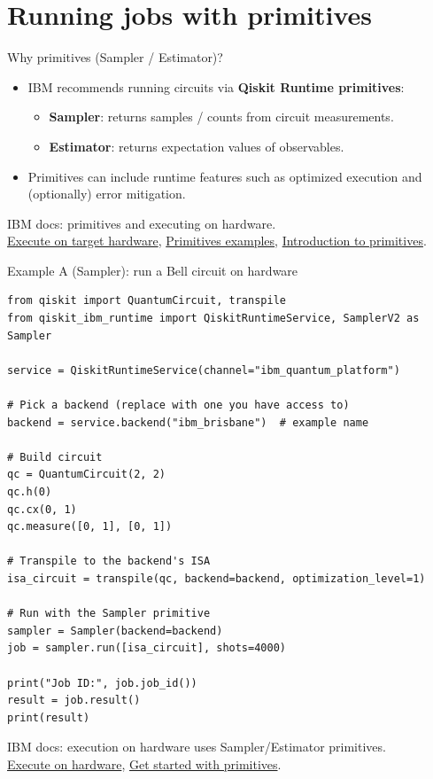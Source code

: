 \documentclass{beamer}
\begin{document}
\section{Running jobs with primitives}

\begin{frame}{Why primitives (Sampler / Estimator)?}
\begin{itemize}
  \item IBM recommends running circuits via \textbf{Qiskit Runtime primitives}:
    \begin{itemize}
      \item \textbf{Sampler}: returns samples / counts from circuit measurements.
      \item \textbf{Estimator}: returns expectation values of observables.
    \end{itemize}
  \item Primitives can include runtime features such as optimized execution and (optionally) error mitigation.
\end{itemize}

\vspace{0.4em}
\scriptsize
IBM docs: primitives and executing on hardware.\\
\href{https://quantum.cloud.ibm.com/docs/guides/execute-on-hardware}{Execute on target hardware},
\href{https://quantum.cloud.ibm.com/docs/guides/primitives-examples}{Primitives examples},
\href{https://qiskit.qotlabs.org/docs/guides/primitives}{Introduction to primitives}.%
\end{frame}

\begin{frame}[fragile]{Example A (Sampler): run a Bell circuit on hardware}
\begin{lstlisting}
from qiskit import QuantumCircuit, transpile
from qiskit_ibm_runtime import QiskitRuntimeService, SamplerV2 as Sampler

service = QiskitRuntimeService(channel="ibm_quantum_platform")

# Pick a backend (replace with one you have access to)
backend = service.backend("ibm_brisbane")  # example name

# Build circuit
qc = QuantumCircuit(2, 2)
qc.h(0)
qc.cx(0, 1)
qc.measure([0, 1], [0, 1])

# Transpile to the backend's ISA
isa_circuit = transpile(qc, backend=backend, optimization_level=1)

# Run with the Sampler primitive
sampler = Sampler(backend=backend)
job = sampler.run([isa_circuit], shots=4000)

print("Job ID:", job.job_id())
result = job.result()
print(result)
\end{lstlisting}

\vspace{0.2em}
\scriptsize
IBM docs: execution on hardware uses Sampler/Estimator primitives.\\
\href{https://quantum.cloud.ibm.com/docs/guides/execute-on-hardware}{Execute on hardware},
\href{https://quantum.cloud.ibm.com/docs/guides/get-started-with-primitives}{Get started with primitives}.%
\end{frame}
\end{document}
